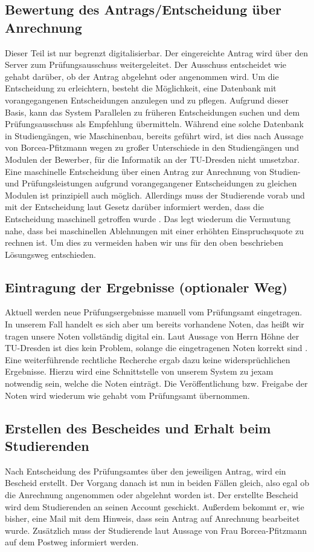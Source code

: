 \subsection{Bewertung des Antrags/Entscheidung über Anrechnung}
Dieser Teil ist nur begrenzt digitalisierbar. Der eingereichte Antrag wird über den Server zum Prüfungsausschuss weitergeleitet. Der Ausschuss entscheidet wie gehabt darüber, ob der Antrag abgelehnt oder angenommen wird. Um die Entscheidung zu erleichtern, besteht die Möglichkeit, eine Datenbank mit vorangegangenen Entscheidungen anzulegen und zu pflegen. Aufgrund dieser Basis, kann das System Parallelen zu früheren Entscheidungen suchen und dem Prüfungsausschuss als Empfehlung übermitteln. Während eine solche Datenbank in Studiengängen, wie Maschinenbau, bereits geführt wird, ist dies nach Aussage von Borcea-Pfitzmann wegen zu großer Unterschiede in den Studiengängen und Modulen der Bewerber, für die Informatik an der TU-Dresden nicht umsetzbar.
Eine maschinelle Entscheidung über einen Antrag zur Anrechnung von Studien- und Prüfungsleistungen aufgrund vorangegangener Entscheidungen zu gleichen Modulen ist prinzipiell auch möglich. Allerdings muss der Studierende vorab und mit der Entscheidung laut Gesetz darüber informiert werden, dass die Entscheidung maschinell getroffen wurde \parencite{dsgvo}. Das legt wiederum die Vermutung nahe, dass bei maschinellen Ablehnungen mit einer erhöhten Einspruchsquote zu rechnen ist. Um dies zu vermeiden haben wir uns für den oben beschrieben Lösungsweg entschieden.

\subsection{Eintragung der Ergebnisse (optionaler Weg)}
Aktuell werden neue Prüfungsergebnisse manuell vom Prüfungsamt eingetragen. In unserem Fall handelt es sich aber um bereits vorhandene Noten, das heißt wir tragen unsere Noten vollständig digital ein. Laut Aussage von Herrn Höhne der TU-Dresden ist dies kein Problem, solange die eingetragenen Noten korrekt sind \parencite{email}. Eine weiterführende rechtliche Recherche ergab dazu keine widersprüchlichen Ergebnisse.
Hierzu wird eine Schnittstelle von unserem System zu jexam notwendig sein, welche die Noten einträgt. Die Veröffentlichung bzw. Freigabe der Noten wird wiederum wie gehabt vom Prüfungsamt übernommen.

\subsection{Erstellen des Bescheides und Erhalt beim Studierenden}
Nach Entscheidung des Prüfungsamtes über den jeweiligen Antrag, wird ein Bescheid erstellt. Der Vorgang danach ist nun in beiden Fällen gleich, also egal ob die Anrechnung angenommen oder abgelehnt worden ist. Der erstellte Bescheid wird dem Studierenden an seinen Account geschickt. Außerdem bekommt er, wie bisher, eine Mail mit dem Hinweis, dass sein Antrag auf Anrechnung bearbeitet wurde. Zusätzlich muss der Studierende laut Aussage von Frau Borcea-Pfitzmann auf dem Postweg informiert werden.

